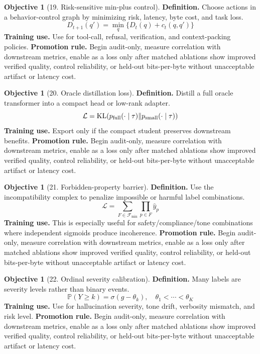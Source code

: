 \documentclass[11pt]{article}
\theoremstyle{definition}
\newtheorem{objective}[theorem]{Objective}
\theoremstyle{remark}
\newcommand{\KL}{\operatorname{KL}}
\newcommand{\Prob}{\mathbb{P}}
\newcommand{\loss}{\mathcal{L}}
\numberwithin{equation}{section}
\begin{document}
\begin{objective}[19. Risk-sensitive min-plus control]
\textbf{Definition.} Choose actions in a behavior-control graph by minimizing risk, latency, byte cost, and task loss.
\begin{equation}
    D_{t+1}(q')=\min_q\{D_t(q)+c_t(q,q')\}
\end{equation}
\textbf{Training use.} Use for tool-call, refusal, verification, and context-packing policies.
\textbf{Promotion rule.} Begin audit-only, measure correlation with downstream metrics, enable as a loss only after matched ablations show improved verified quality, control reliability, or held-out bits-per-byte without unacceptable artifact or latency cost.
\end{objective}


\begin{objective}[20. Oracle distillation loss]
\textbf{Definition.} Distill a full oracle transformer into a compact head or low-rank adapter.
\begin{equation}
    \loss=\KL(p_{\rm full}(\cdot\mid\tau)\|p_{\rm small}(\cdot\mid\tau))
\end{equation}
\textbf{Training use.} Export only if the compact student preserves downstream benefits.
\textbf{Promotion rule.} Begin audit-only, measure correlation with downstream metrics, enable as a loss only after matched ablations show improved verified quality, control reliability, or held-out bits-per-byte without unacceptable artifact or latency cost.
\end{objective}


\begin{objective}[21. Forbidden-property barrier]
\textbf{Definition.} Use the incompatibility complex to penalize impossible or harmful label combinations.
\begin{equation}
    \loss=\sum_{F\in\mathcal F_{\min}}\prod_{p\in F}\hat y_p
\end{equation}
\textbf{Training use.} This is especially useful for safety/compliance/tone combinations where independent sigmoids produce incoherence.
\textbf{Promotion rule.} Begin audit-only, measure correlation with downstream metrics, enable as a loss only after matched ablations show improved verified quality, control reliability, or held-out bits-per-byte without unacceptable artifact or latency cost.
\end{objective}


\begin{objective}[22. Ordinal severity calibration]
\textbf{Definition.} Many labels are severity levels rather than binary events.
\begin{equation}
    \Prob(Y\ge k)=\sigma(g-\theta_k),\quad \theta_1<\cdots<\theta_K
\end{equation}
\textbf{Training use.} Use for hallucination severity, tone drift, verbosity mismatch, and risk level.
\textbf{Promotion rule.} Begin audit-only, measure correlation with downstream metrics, enable as a loss only after matched ablations show improved verified quality, control reliability, or held-out bits-per-byte without unacceptable artifact or latency cost.
\end{objective}
\end{document}
